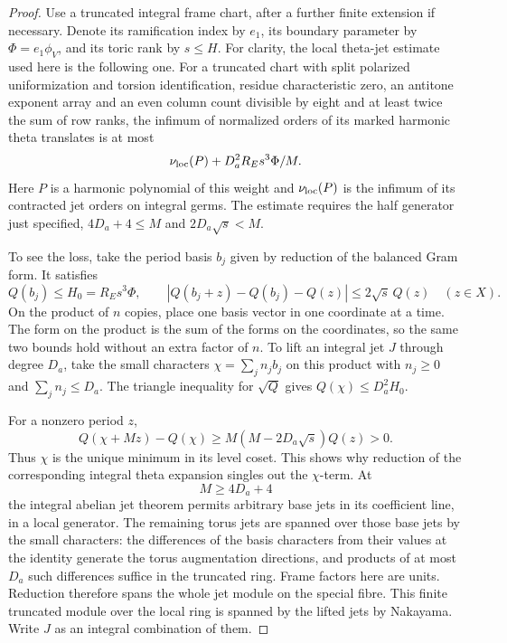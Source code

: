 \begin{proof}
Use a truncated integral frame chart, after a further
finite extension if necessary. Denote its ramification
index by \(e_1\), its boundary parameter by
\(\Phi=e_1\phi_V\), and its toric rank by \(s\le H\).
For clarity, the local theta-jet estimate used here is the
following one. For a truncated chart with split polarized
uniformization and torsion identification, residue
characteristic zero, an antitone exponent array and an even column count divisible
by eight and at least twice the sum of row ranks, the infimum of
normalized orders of its marked harmonic theta translates
is at most
\[
 \nu_{\rm loc}(P)+D_a^2 R_E s^3\Phi/M .
\]
Here \(P\) is a harmonic polynomial of this weight and
\(\nu_{\rm loc}(P)\) is the infimum of its contracted jet
orders on integral germs. The estimate requires the half
generator just specified, \(4D_a+4\le M\) and
\(2D_a\sqrt s<M\).

To see the loss, take the period basis \(b_j\) given by
reduction of the balanced Gram form. It satisfies
\[
 Q(b_j)\le H_0=R_Es^3\Phi,\qquad
 |Q(b_j+z)-Q(b_j)-Q(z)|\le 2\sqrt{s}\,Q(z)
 \quad(z\in X).
\]
On the product of \(n\) copies, place one basis vector
in one coordinate at a time. The form on the product is
the sum of the forms on the coordinates, so the same
two bounds hold without an extra factor of \(n\).
To lift an integral jet \(J\) through degree \(D_a\), take
the small characters \(\chi=\sum_j n_j b_j\) on this product
with \(n_j\ge0\) and \(\sum_j n_j\le D_a\).
The triangle inequality for \(\sqrt Q\) gives
\(Q(\chi)\le D_a^2 H_0\).

For a nonzero period \(z\),
\[
 Q(\chi+Mz)-Q(\chi)
     \ge M(M-2D_a\sqrt{s})Q(z)>0 .
\]
Thus \(\chi\) is the unique minimum in its level coset.
This shows why reduction of the corresponding integral
theta expansion singles out the \(\chi\)-term. At
\[
 M\ge4D_a+4
\]
the integral abelian jet theorem permits
arbitrary base jets in its coefficient line, in a local
generator. The remaining torus jets are spanned over those
base jets by the small characters: the differences of the
basis characters from their values at the identity generate
the torus augmentation directions, and products of at most
\(D_a\) such differences suffice in the truncated ring.
Frame factors here are units. Reduction therefore spans
the whole jet module on the special fibre. This finite
truncated module over the local ring is spanned by the lifted
jets by Nakayama. Write \(J\) as an integral combination
of them.


\end{proof}
